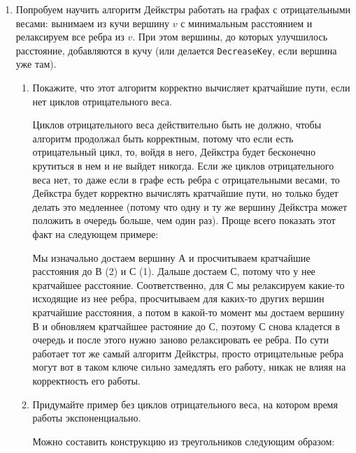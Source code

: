 \begin{enumerate}
  \item
    Попробуем научить алгоритм Дейкстры работать на графах с отрицательными весами: вынимаем из кучи вершину $v$
    с минимальным расстоянием и релаксируем все ребра из $v$. При этом вершины, до которых улучшилось расстояние,
    добавляются в кучу (или делается \texttt{DecreaseKey}, если вершина уже там).
    \begin{enumerate}
      \item Покажите, что этот алгоритм корректно вычисляет кратчайшие пути, если нет циклов отрицательного веса.
      \begin{solution}
        Циклов отрицательного веса действительно быть не должно, чтобы алгоритм продолжал быть корректным, потому что если есть отрицательный цикл, то, войдя в него, Дейкстра будет бесконечно крутиться в нем и не выйдет никогда. Если же циклов отрицательного веса нет, то даже если в графе есть ребра с отрицательными весами, то Дейкстра будет корректно вычислять кратчайшие пути, но только будет делать это медленнее (потому что одну и ту же вершину Дейкстра может положить в очередь больше, чем один раз). Проще всего показать этот факт на следующем примере:

        Мы изначально достаем вершину А и просчитываем кратчайшие расстояния до В (2) и С (1). Дальше достаем С, потому что у нее кратчайшее расстояние. Соответственно, для С мы релаксируем какие-то исходящие из нее ребра, просчитываем для каких-то других вершин кратчайшие расстояния, а потом в какой-то момент мы достаем вершину В и обновляем кратчайшее растояние до С, поэтому С снова кладется в очередь и после этого нужно заново релаксировать ее ребра. По сути работает тот же самый алгоритм Дейкстры, просто отрицательные ребра могут вот в таком ключе сильно замедлять его работу, никак не влияя на корректность его работы.
      \end{solution}
      \item Придумайте пример без циклов отрицательного веса, на котором время работы экспоненциально.
      \begin{solution}
        Можно составить конструкцию из треугольников следующим образом:


\end{solution}
\end{enumerate}
\end{enumerate}

